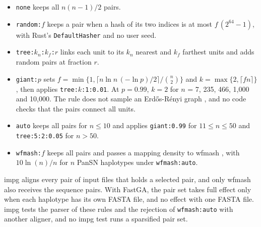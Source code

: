 \begin{itemize}
\item \texttt{none} keeps all $n(n-1)/2$ pairs.
\item \texttt{random:}$f$ keeps a pair when a hash of its two indices is at most $f\,(2^{64}-1)$, with Rust's \texttt{DefaultHasher} and no user seed.
\item \texttt{tree:}$k_n$\texttt{:}$k_f$\texttt{:}$r$ links each unit to its $k_n$ nearest and $k_f$ farthest units and adds random pairs at fraction $r$.
\item \texttt{giant:}$p$ sets $f=\min\{1,\lceil n\ln n\,(-\ln p)/2\rceil/\binom{n}{2}\}$ and $k=\max\{2,\lceil fn\rceil\}$, then applies \texttt{tree:}$k$\texttt{:1:0.01}.
At $p=0.99$, $k=2$ for $n$ = 7, 235, 466, 1,000 and 10,000.
The rule does not sample an Erd\H{o}s-R\'enyi graph \citep{Erdos1959random}, and no code checks that the pairs connect all units.
\item \texttt{auto} keeps all pairs for $n\le 10$ and applies \texttt{giant:0.99} for $11\le n\le 50$ and \texttt{tree:5:2:0.05} for $n>50$.
\item \texttt{wfmash:}$f$ keeps all pairs and passes a mapping density to wfmash \citep{Guarracino2024wfmash}, with $10\ln(n)/n$ for $n$ PanSN haplotypes under \texttt{wfmash:auto}.
\end{itemize}

impg aligns every pair of input files that holds a selected pair, and only wfmash also receives the sequence pairs.
With FastGA, the pair set takes full effect only when each haplotype has its own FASTA file, and no effect with one FASTA file.
impg tests the parser of these rules and the rejection of \texttt{wfmash:auto} with another aligner, and no impg test runs a sparsified pair set.

